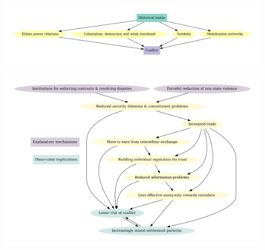 \documentclass{beamer}
\begin{document}
\begin{frame}
\end{frame}


\begin{frame} %
	\begin{figure}
		\includegraphics[width=\linewidth]{img/graf.pdf}
	\end{figure}
\end{frame}


\begin{frame}
\end{frame}


\begin{frame} %
	\begin{figure}
		\includegraphics[width=\linewidth]{img/OMTcausal.pdf}
	\end{figure}
\end{frame}


\begin{frame}
\end{frame}
\end{document}
